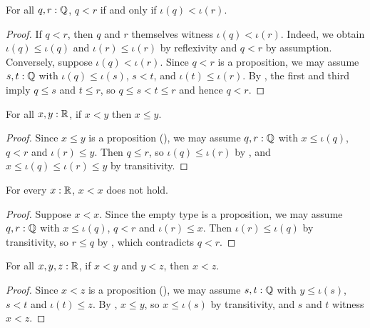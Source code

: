 \begin{lemma}
  \label{ltIffRatLtReal}
  For all $q, r : \mathbb{Q}$, $q < r$ if and only if $\iota(q) < \iota(r)$.
\end{lemma}
\begin{proof}
  If $q < r$, then $q$ and $r$ themselves witness $\iota(q) < \iota(r)$. Indeed, we obtain $\iota(q) \le \iota(q)$ and $\iota(r) \le \iota(r)$ by reflexivity and $q < r$ by assumption. Conversely, suppose $\iota(q) < \iota(r)$. Since $q < r$ is a proposition, we may assume $s, t : \mathbb{Q}$ with $\iota(q) \le \iota(s)$, $s < t$, and $\iota(t) \le \iota(r)$. By , the first and third imply $q \le s$ and $t \le r$, so $q \le s < t \le r$ and hence $q < r$.
\end{proof}

\begin{lemma}
  \label{ltWeakenLeReal}
  For all $x, y : \mathbb{R}$, if $x < y$ then $x \le y$.
\end{lemma}
\begin{proof}
  Since $x \le y$ is a proposition (), we may assume $q, r : \mathbb{Q}$ with $x \le \iota(q)$, $q < r$ and $\iota(r) \le y$. Then $q \le r$, so $\iota(q) \le \iota(r)$ by , and $x \le \iota(q) \le \iota(r) \le y$ by transitivity.
\end{proof}

\begin{lemma}
  \label{isIrreflLtReal}
  For every $x : \mathbb{R}$, $x < x$ does not hold.
\end{lemma}
\begin{proof}
  Suppose $x < x$. Since the empty type is a proposition, we may assume $q, r : \mathbb{Q}$ with $x \le \iota(q)$, $q < r$ and $\iota(r) \le x$. Then $\iota(r) \le \iota(q)$ by transitivity, so $r \le q$ by , which contradicts $q < r$.
\end{proof}

\begin{lemma}
  \label{isTransLtReal}
  For all $x, y, z : \mathbb{R}$, if $x < y$ and $y < z$, then $x < z$.
\end{lemma}
\begin{proof}
  Since $x < z$ is a proposition (), we may assume $s, t : \mathbb{Q}$ with $y \le \iota(s)$, $s < t$ and $\iota(t) \le z$. By , $x \le y$, so $x \le \iota(s)$ by transitivity, and $s$ and $t$ witness $x < z$.
\end{proof}

